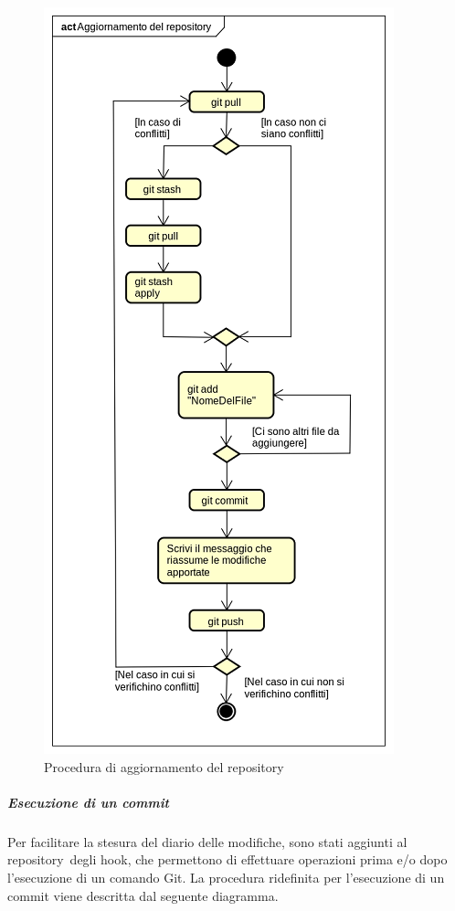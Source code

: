 \documentclass[../NormeProgetto.text]{subfiles}
\begin{document}
				\begin{figure}[H]
					\centering
					\includegraphics[scale=0.95]{sections/img/proceduraAggiornamentoRepository.png}
					\caption{Procedura di aggiornamento del repository}\label{fig:Procedura di aggiornamento del repository} 
				\end{figure}
			\subparagraph{Esecuzione di un commit}
				Per facilitare la stesura del diario delle modifiche, sono stati aggiunti al repository\g\ degli hook, che permettono di effettuare operazioni prima e/o dopo l'esecuzione di un comando Git\g. La procedura ridefinita per l'esecuzione di un commit viene descritta dal seguente diagramma.
\end{document}
